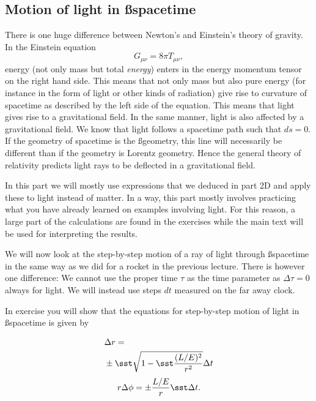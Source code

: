 {\vspace*{1cm}

\begin{multicols}{2}

\section{Motion of light in \ss spacetime}
\label{sect:motion}

There is one huge difference between Newton's and Einstein's theory of gravity. In the Einstein equation
\[
G_{\mu\nu}=8\pi T_{\mu\nu},
\]
energy (not only mass but total \emph{energy}) enters in the energy momentum tensor on the right hand side. This means that not only mass but also pure energy (for instance in the form of light or other kinds of radiation) give rise to curvature of spacetime as described by the left side of the equation. This means that light gives rise to a gravitational field. In the same manner, light is also affected by a gravitational field. We know that light follows a spacetime path such that $ds=0$. If the geometry of spacetime is the \ss geometry, this line will necessarily be different than if the geometry is Lorentz geometry. Hence the general theory of relativity predicts light rays to be deflected in a gravitational field. 

In this part we will mostly use expressions that we deduced in part 2D and apply these to light instead of matter. In a way, this part mostly involves practicing what you have already learned on examples involving light. For this reason, a large part of the calculations are found in the exercises while the main text will be used for interpreting the results.

We will now look at the step-by-step motion of a ray of light through \ss spacetime in the same way as we did for a rocket in the previous lecture. There is however one difference: We cannot use the proper time $\tau$ as the time parameter as $\Delta\tau=0$ always for light. We will instead use steps $dt$ measured on the far away clock.

In exercise  you will show that the equations for step-by-step motion of light in \ss spacetime is given by
\begin{formbox}
\begin{align}
&\Delta r=\nonumber\\
&\pm \sst\sqrt{1-\sst\frac{(L/E)^2}{r^2}}\Delta t \label{eq:r}
\end{align}
\begin{equation}
\label{eq:phi}
r\Delta\phi=\pm\frac{L/E}{r}\sst\Delta t.
\end{equation}
\end{formbox}


\end{multicols}}
